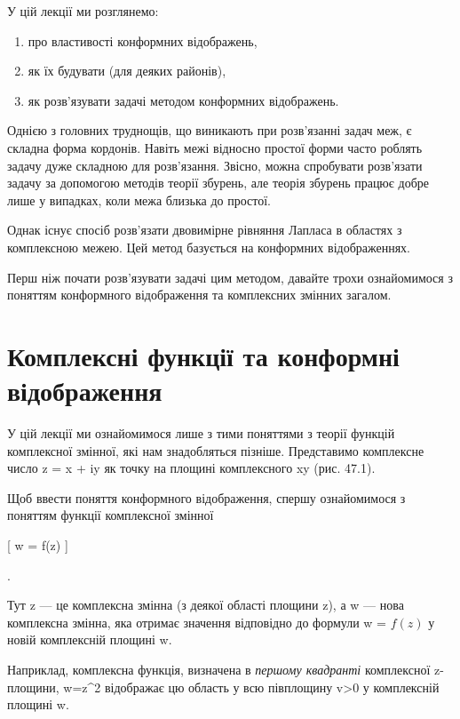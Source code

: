 \documentclass[
]{article}
\begin{document}
У цій лекції ми розглянемо:

\begin{enumerate}
\def\labelenumi{\arabic{enumi})}
\item
  про властивості конформних відображень,
\item
  як їх будувати (для деяких районів),
\item
  як розв'язувати задачі методом конформних відображень.
\end{enumerate}

Однією з головних труднощів, що виникають при розв'язанні задач меж, є
складна форма кордонів. Навіть межі відносно простої форми часто роблять
задачу дуже складною для розв'язання. Звісно, можна спробувати
розв'язати задачу за допомогою методів теорії збурень, але теорія
збурень працює добре лише у випадках, коли межа близька до простої.

Однак існує спосіб розв'язати двовимірне рівняння Лапласа в областях з
комплексною межею. Цей метод базується на конформних відображеннях.

Перш ніж почати розв'язувати задачі цим методом, давайте трохи
ознайомимося з поняттям конформного відображення та комплексних змінних
загалом.

\section{Комплексні функції та конформні
відображення}\label{ux43aux43eux43cux43fux43bux435ux43aux441ux43dux456-ux444ux443ux43dux43aux446ux456ux457-ux442ux430-ux43aux43eux43dux444ux43eux440ux43cux43dux456-ux432ux456ux434ux43eux431ux440ux430ux436ux435ux43dux43dux44f}

У цій лекції ми ознайомимося лише з тими поняттями з теорії функцій
комплексної змінної, які нам знадобляться пізніше. Представимо
комплексне число z = x + iy як точку на площині комплексного xy (рис.
47.1).

Щоб ввести поняття конформного відображення, спершу ознайомимося з
поняттям функції комплексної змінної

{[} w = f(z) {]}

.

Тут z --- це комплексна змінна (з деякої області площини z), а w ---
нова комплексна змінна, яка отримає значення відповідно до формули w =
\(f(z)\) у новій комплексній площині w.

Наприклад, комплексна функція, визначена в \emph{першому квадранті}
комплексної z-площини, w=z\^{}2 відображає цю область у всю півплощину
v\textgreater0 у комплексній площині w.
\end{document}
